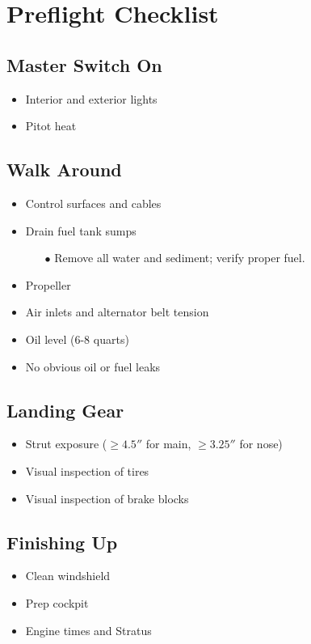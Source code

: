 \def\todoitem#1{
    \item[$\square$] #1 \dotfill
}

\section{Preflight Checklist}

\subsection{Master Switch On}

\begin{itemize}
    \todoitem{Interior and exterior lights}
    \todoitem{Pitot heat}
\end{itemize}

\subsection{Walk Around}

\begin{itemize}
    \todoitem{Control surfaces and cables}
    \todoitem{Drain fuel tank sumps}
    \begin{itemize}
        \item[$\bullet$] Remove all water and sediment; verify proper fuel.
    \end{itemize}
    \todoitem{Propeller}
    \todoitem{Air inlets and alternator belt tension}
    \todoitem{Oil level (6-8 quarts)}
    \todoitem{No obvious oil or fuel leaks}
\end{itemize}

\subsection{Landing Gear}

\begin{itemize}
    \todoitem{Strut exposure ($\geq 4.5''$ for main, $\geq 3.25''$ for nose)} %
    \todoitem{Visual inspection of tires} %
    \todoitem{Visual inspection of brake blocks}
\end{itemize}

\subsection{Finishing Up}

\begin{itemize}
    \todoitem{Clean windshield}
    \todoitem{Prep cockpit}
    \todoitem{Engine times and Stratus}
\end{itemize}
